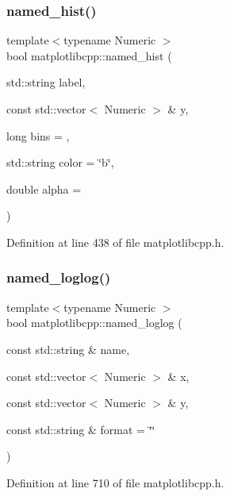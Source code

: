 \subsubsection{\texorpdfstring{named\_hist()}{named\_hist()}}
{\footnotesize\ttfamily template$<$typename Numeric $>$ \\
bool matplotlibcpp\+::named\+\_\+hist (\begin{DoxyParamCaption}\item[{std\+::string}]{label,  }\item[{const std\+::vector$<$ Numeric $>$ \&}]{y,  }\item[{long}]{bins = {},  }\item[{std\+::string}]{color = {\ttfamily \char`\"{}b\char`\"{}},  }\item[{double}]{alpha = {} }\end{DoxyParamCaption})}



Definition at line 438 of file matplotlibcpp.\+h.

\mbox{\label{namespacematplotlibcpp_ad7616968e5a639737fd547eb7fa0a8a0}} 
\subsubsection{\texorpdfstring{named\_loglog()}{named\_loglog()}}
{\footnotesize\ttfamily template$<$typename Numeric $>$ \\
bool matplotlibcpp\+::named\+\_\+loglog (\begin{DoxyParamCaption}\item[{const std\+::string \&}]{name,  }\item[{const std\+::vector$<$ Numeric $>$ \&}]{x,  }\item[{const std\+::vector$<$ Numeric $>$ \&}]{y,  }\item[{const std\+::string \&}]{format = {\ttfamily \char`\"{}\char`\"{}} }\end{DoxyParamCaption})}



Definition at line 710 of file matplotlibcpp.\+h.

\mbox{\label{namespacematplotlibcpp_a6461c03041d9947a0e3b3593b5b72c95}} 
